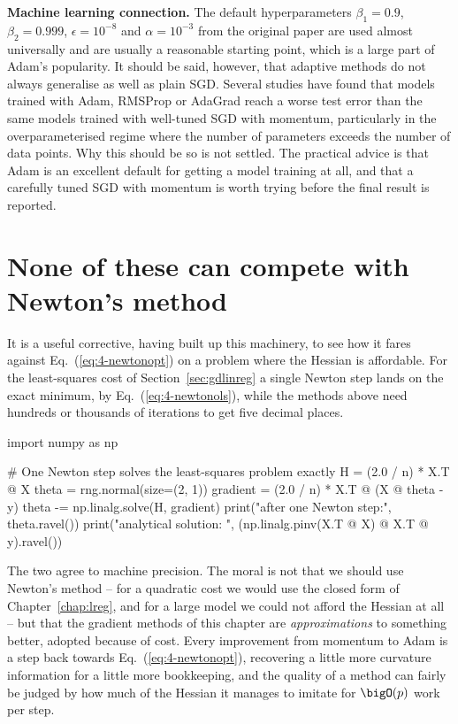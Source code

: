 \begin{notebox}
\textbf{Machine learning connection.} The default hyperparameters
$\beta_1=0.9$, $\beta_2=0.999$, $\epsilon=10^{-8}$ and $\alpha=10^{-3}$ from
the original paper are used almost universally and are usually a reasonable
starting point, which is a large part of Adam's popularity.  It should be
said, however, that adaptive methods do not always generalise as well as
plain SGD.  Several studies have found that models trained with Adam, RMSProp
or AdaGrad reach a worse test error than the same models trained with
well-tuned SGD with momentum, particularly in the overparameterised regime
where the number of parameters exceeds the number of data points.  Why this
should be so is not settled.  The practical advice is that Adam is an
excellent default for getting a model training at all, and that a carefully
tuned SGD with momentum is worth trying before the final result is reported.
\end{notebox}

\section{None of these can compete with Newton's method}
\label{sec:newtoncompete}

It is a useful corrective, having built up this machinery, to see how it fares
against Eq.~(\ref{eq:4-newtonopt}) on a problem where the Hessian is
affordable.  For the least-squares cost of Section~\ref{sec:gdlinreg} a single
Newton step lands on the exact minimum, by Eq.~(\ref{eq:4-newtonols}), while
the methods above need hundreds or thousands of iterations to get five decimal
places.

\begin{Python}{}
import numpy as np

# One Newton step solves the least-squares problem exactly
H = (2.0 / n) * X.T @ X
theta = rng.normal(size=(2, 1))
gradient = (2.0 / n) * X.T @ (X @ theta - y)
theta -= np.linalg.solve(H, gradient)
print("after one Newton step:", theta.ravel())
print("analytical solution:  ", (np.linalg.pinv(X.T @ X) @ X.T @ y).ravel())
\end{Python}

The two agree to machine precision.  The moral is not that we should use
Newton's method -- for a quadratic cost we would use the closed form of
Chapter~\ref{chap:lreg}, and for a large model we could not afford the
Hessian at all -- but that the gradient methods of this chapter are
\emph{approximations} to something better, adopted because of cost.  Every
improvement from momentum to Adam is a step back towards
Eq.~(\ref{eq:4-newtonopt}), recovering a little more curvature information for
a little more bookkeeping, and the quality of a method can fairly be judged by
how much of the Hessian it manages to imitate for $\bigO(p)$ work per step.

